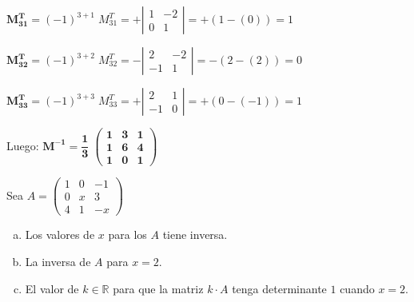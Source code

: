 \begin{proofw}
  \noindent $\boldsymbol{M^T_{31}}=(-1)^{3+1}\; M^T_{31}=+\left| \begin{matrix}
 1&-2\\0&1	
 \end{matrix} \right|=+(1 -(0))=1 $
 
  \noindent $\boldsymbol{M^T_{32}}=(-1)^{3+2}\; M^T_{32}=-\left| \begin{matrix}
 2&-2\\-1&1	
 \end{matrix} \right|=-( 2-(2))=0 $
 
  \noindent $\boldsymbol{M^T_{33}}=(-1)^{3+3}\; M^T_{33}=+\left| \begin{matrix}
 2&1\\-1&0	
 \end{matrix} \right|=+(0 -(-1))= 1$
 
\noindent Luego:  $\boldsymbol{ M^{-1}=\dfrac 1 3 \; \left( \begin{matrix} 1&3&1\\1&6&4\\1&0&1 \end{matrix} \right) }$
 
\end{proofw}
	
\begin{ejre}
	Sea $A=\left( \begin{matrix} 1&0&-1\\0&x&3\\4&1&-x  \end{matrix} \right)$
	\begin{enumerate}[a) ]
	\item Los valores de $x$ para los $A$ tiene inversa.
	\item La inversa de $A$ para $x=2$.
	\item El valor de $k \in \mathbb R$ para que la matriz $k\cdot A$ tenga determinante $1$ cuando $x=2$.	
	\end{enumerate}

\end{ejre}

